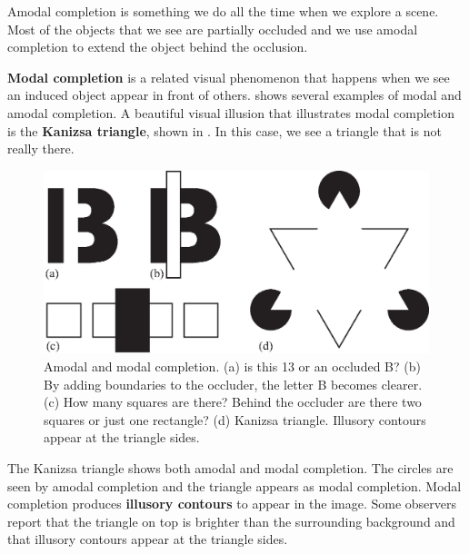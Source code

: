 Amodal completion is something we do all the time when we explore a scene. Most of the objects that we see are partially occluded and we use amodal completion to extend the object behind the occlusion. 

{\bf Modal completion} 
is a related visual phenomenon that happens when we see an induced object appear in front of others. \Fig{\ref{fig:kanizsa}} shows several examples of modal and amodal completion. A beautiful visual illusion that illustrates modal completion is the {\bf Kanizsa triangle}, shown in . In this case, we see a triangle that is not really there. 


\begin{figure}
\centerline{
\includegraphics[width=1\linewidth]{figures/taxonomy/kanizsa.eps}
} 
\caption{Amodal and modal completion. (a) is this 13 or an occluded B? (b) By adding boundaries to the occluder, the letter B becomes clearer. (c) How many squares are there? Behind the occluder are there two squares or just one rectangle? (d) Kanizsa triangle. Illusory contours appear at the triangle sides.} 
\label{fig:kanizsa}
\end{figure}

The Kanizsa triangle shows both amodal and modal completion. The circles are seen by amodal completion and the triangle appears as modal completion. Modal completion produces {\bf illusory contours} to appear in the image. Some observers report that the triangle on top is brighter than the surrounding background and that illusory contours appear at the triangle sides.




